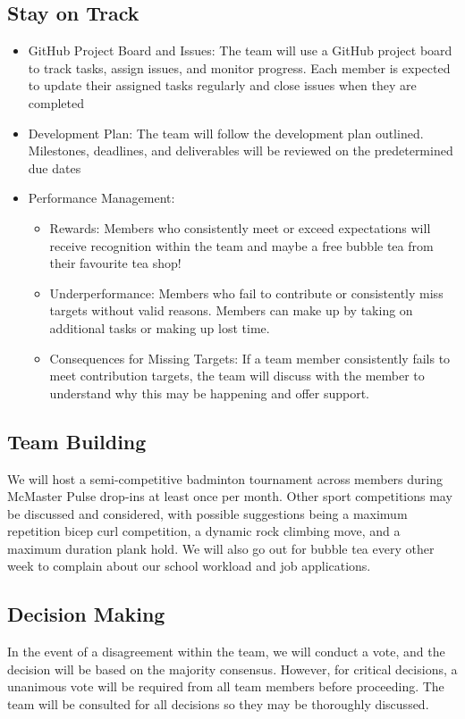 \documentclass{article}
\begin{document}
\subsection{Stay on Track}

\begin{itemize}
    \item GitHub Project Board and Issues: The team will use a GitHub project board to track tasks, assign issues, and monitor progress. Each member is expected to update their assigned tasks regularly and close issues when they are completed
    \item Development Plan: The team will follow the development plan outlined. Milestones, deadlines, and deliverables will be reviewed on the predetermined due dates
    \item Performance Management:
        \begin{itemize}
        \item Rewards: Members who consistently meet or exceed expectations will receive recognition within the team and maybe a free bubble tea from their favourite tea shop!
        \item Underperformance: Members who fail to contribute or consistently miss targets without valid reasons. Members can make up by taking on additional tasks or making up lost time.
        \item Consequences for Missing Targets: If a team member consistently fails to meet contribution targets, the team will discuss with the member to understand why this may be happening and offer support.
        \end{itemize}
\end{itemize}

\subsection{Team Building}

We will host a semi-competitive badminton tournament across members during McMaster Pulse drop-ins at least once per month. Other sport competitions may be discussed and considered, with possible suggestions being a maximum repetition bicep curl competition, a dynamic rock climbing move, and a maximum duration plank hold. We will also go out for bubble tea every other week to complain about our school workload and job applications.

\subsection{Decision Making}

In the event of a disagreement within the team, we will conduct a vote, and the decision will be based on the majority consensus. However, for critical decisions, a unanimous vote will be required from all team members before proceeding. The team will be consulted for all decisions so they may be thoroughly discussed. 
\end{document}
